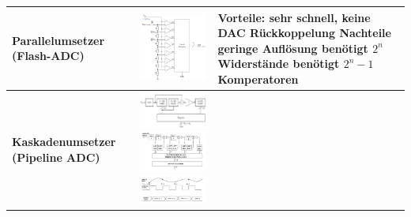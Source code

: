 \begin{longtable}{|>{\bfseries}p{4cm}|p{6cm}|p{8cm}|}
  \hline
    Parallelumsetzer (Flash-ADC) &
    \includegraphics[width=5cm, valign=t]{images/parallelADC} &
    \textbf{Vorteile}:\newline
    sehr schnell, keine DAC Rückkoppelung\newline
    \textbf{Nachteile}\newline
    geringe Auflösung\newline
    benötigt $2^n$ Widerstände \newline
    benötigt $2^n-1$ Komperatoren
   	\\
  \hline
    Kaskadenumsetzer (Pipeline ADC) &
    \includegraphics[width=5cm, valign=t]{images/kaskaden} \newline
    \includegraphics[width=5cm, valign=t]{images/kaskaden_fehlerkorrektur.png} \newline 
    \includegraphics[width=5cm, valign=t]{images/latenz}&
    

\end{longtable}
